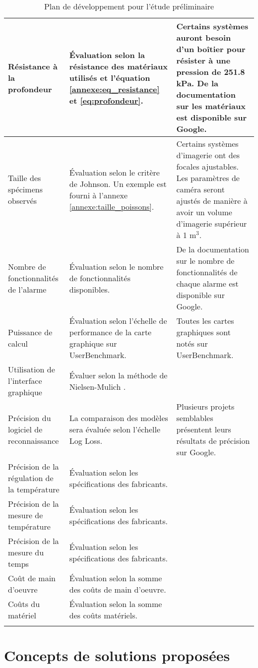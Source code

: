 \begin{longtable}[c]{|p{2.5cm}|p{6cm}|p{6cm}|}
        Résistance à la profondeur & Évaluation selon la résistance des matériaux utilisés et l'équation \ref{annexe:eq_resistance} et \ref{eq:profondeur}. & Certains systèmes auront besoin d'un boîtier pour résister à une pression de 251.8 kPa. De la documentation sur les matériaux est disponible sur Google. \\\hline
        Taille des spécimens observés & Évaluation selon le critère de Johnson. Un exemple est fourni à l'annexe \ref{annexe:taille_poissons}. & Certains systèmes d'imagerie ont des focales ajustables. Les paramètres de caméra seront ajustés de manière à avoir un volume d'imagerie supérieur à 1 m$^3$. \\\hline
        Nombre de fonctionnalités de l'alarme  & Évaluation selon le nombre de fonctionnalités disponibles. & De la documentation sur le nombre de fonctionnalités de chaque alarme est disponible sur Google. \\\hline
        Puissance de calcul & Évaluation selon l'échelle de performance de la carte graphique sur UserBenchmark. & Toutes les cartes graphiques sont notés sur UserBenchmark. \\\hline
        Utilisation de l'interface graphique  & Évaluer selon la méthode de Nielsen-Mulich \cite{nielsen}. & \\
        \hline\hline
        Précision du logiciel de reconnaissance & La comparaison des modèles sera évaluée selon l'échelle Log Loss. & Plusieurs projets semblables présentent leurs résultats de précision sur Google. \\\hline
        Précision de la régulation de la température & Évaluation selon les spécifications des fabricants. &  \\\hline
        Précision de la mesure de température & Évaluation selon les spécifications des fabricants. & \\\hline
        Précision de la mesure du temps & Évaluation selon les spécifications des fabricants. & \\
        \hline\hline
        Coût de main d'oeuvre & Évaluation selon la somme des coûts de main d'oeuvre. & \\\hline
        Coûts du matériel & Évaluation selon la somme des coûts matériels. & \\
        \hline
\caption{Plan de développement pour l'étude préliminaire}
\label{t:plan_dev}
\end{longtable}

\section{Concepts de solutions proposées}

